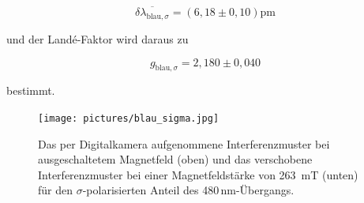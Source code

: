             \begin{equation*}
              \overline{\delta \lambda_{\text{blau}, \sigma}} = \left(6,18 \pm 0,10\right)\si{\pico\metre}
            \end{equation*}

            und der Landé-Faktor wird daraus zu

            \begin{equation*}
              g_{\text{blau}, \sigma} = 2,180 \pm 0,040 
            \end{equation*}

            bestimmt.



              \FloatBarrier

              \begin{figure}[h]
                \centering
                \texttt{[image: pictures/blau\_sigma.jpg]}
                \caption{Das per Digitalkamera aufgenommene Interferenzmuster bei ausgeschaltetem Magnetfeld (oben) und das verschobene Interferenzmuster bei einer Magnetfeldstärke von \SI{263}{\milli\tesla} (unten) für den $\sigma$-polarisierten Anteil des 480\,nm-Übergangs.}
                \label{fig:blau_sigma}
              \end{figure}
          
              \FloatBarrier

